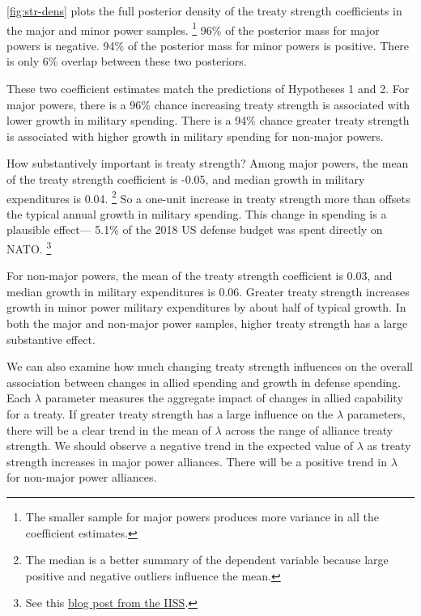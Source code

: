 \documentclass[12pt]{article}
\begin{document}
\autoref{fig:str-dens} plots the full posterior density of the treaty strength coefficients in the major and minor power samples.
\footnote{The smaller sample for major powers produces more variance in all the coefficient estimates.} 
96\% of the posterior mass for major powers is negative. 
94\% of the posterior mass for minor powers is positive. 
There is only 6\% overlap between these two posteriors. 


These two coefficient estimates match the predictions of Hypotheses 1 and 2. 
For major powers, there is a 96\% chance increasing treaty strength is associated with lower growth in military spending. 
There is a 94\% chance greater treaty strength is associated with higher growth in military spending for non-major powers.


How substantively important is treaty strength? 
Among major powers, the mean of the treaty strength coefficient is -0.05, and median growth in military expenditures is 0.04.
\footnote{The median is a better summary of the dependent variable because large positive and negative outliers influence the mean.} 
So a one-unit increase in treaty strength more than offsets the typical annual growth in military spending. 
This change in spending is a plausible effect--- 5.1\% of the 2018 US defense budget was spent directly on NATO.
\footnote{See this \href{https://www.iiss.org/blogs/military-balance/2018/07/us-and-nato-allies-costs-and-value}{blog post from the IISS}.} 


For non-major powers, the mean of the treaty strength coefficient is 0.03, and median growth in military expenditures is 0.06. 
Greater treaty strength increases growth in minor power military expenditures by about half of typical growth. 
In both the major and non-major power samples, higher treaty strength has a large substantive effect. 


We can also examine how much changing treaty strength influences on the overall association between changes in allied spending and growth in defense spending. 
Each $\lambda$ parameter measures the aggregate impact of changes in allied capability for a treaty. 
If greater treaty strength has a large influence on the $\lambda$ parameters, there will be a clear trend in the mean of $\lambda$ across the range of alliance treaty strength.
We should observe a negative trend in the expected value of $\lambda$ as treaty strength increases in major power alliances. 
There will be a positive trend in $\lambda$ for non-major power alliances. 
\end{document}
